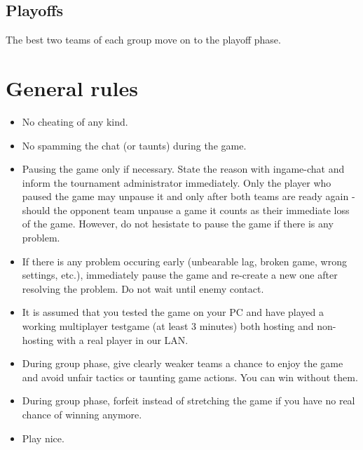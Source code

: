 \documentclass{article}
\begin{document}
\subsection{Playoffs}
The best two teams of each group move on to the playoff phase.


\section{General rules}
\begin{itemize}
\item No cheating of any kind.
\item No spamming the chat (or taunts) during the game.
\item Pausing the game only if necessary. State the reason with ingame-chat and inform the tournament administrator immediately. Only the player who paused the game may unpause it and only after both teams are ready again - should the opponent team unpause a game it counts as their immediate loss of the game. However, do not hesistate to pause the game if there is any problem.
\item If there is any problem occuring early (unbearable lag, broken game, wrong settings, etc.), immediately pause the game and re-create a new one after resolving the problem. Do not wait until enemy contact.
\item It is assumed that you tested the game on your PC and have played a working multiplayer testgame (at least 3 minutes) both hosting and non-hosting with a real player in our LAN.
\item During group phase, give clearly weaker teams a chance to enjoy the game and avoid unfair tactics or taunting game actions. You can win without them.
\item During group phase, forfeit instead of stretching the game if you have no real chance of winning anymore.
\item Play nice.
\end{itemize}
\end{document}
